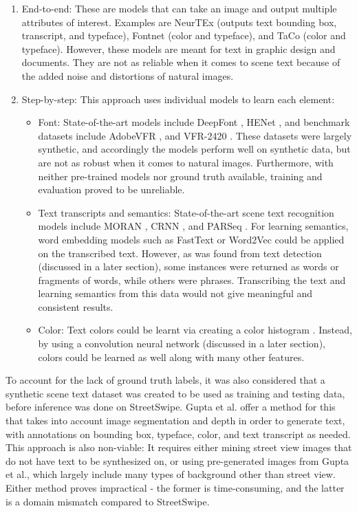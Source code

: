 \begin{enumerate}
    \item End-to-end: These are models that can take an image and output multiple attributes of interest. Examples are NeurTEx \cite{aggarwal_neurtex_2022} (outputs text bounding box, transcript, and typeface), Fontnet \cite{s_fontnet_2021} (color and typeface), and TaCo \cite{nie_taco_2022} (color and typeface). However, these models are meant for text in graphic design and documents. They are not as reliable when it comes to scene text because of the added noise and distortions of natural images.
    \item Step-by-step: This approach uses individual models to learn each element:
    \begin{itemize}
        \item Font: State-of-the-art models include DeepFont \cite{wang_deepfont_2015}, HENet \cite{chen_henet_2021}, and benchmark datasets include AdobeVFR \cite{wang_deepfont_2015}, and VFR-2420 \cite{chen_large-scale_2014}. These datasets were largely synthetic, and accordingly the models perform well on synthetic data, but are not as robust when it comes to natural images. Furthermore, with neither pre-trained models nor ground truth available, training and evaluation proved to be unreliable.
        \item Text transcripts and semantics: State-of-the-art scene text recognition models include MORAN \cite{luo_multi-object_2019}, CRNN \cite{shi_end2end_2015}, and PARSeq \cite{bautista_scene_2022}. For learning semantics, word embedding models such as FastText \cite{bojanowski_enriching_2017} or Word2Vec \cite{mikolov_efficient_2013} could be applied on the transcribed text. However, as was found from text detection (discussed in a later section), some instances were returned as words or fragments of words, while others were phrases. Transcribing the text and learning semantics from this data would not give meaningful and consistent results.
        \item Color: Text colors could be learnt via creating a color histogram \cite{srivastava_review_2015}. Instead, by using a convolution neural network (discussed in a later section), colors could be learned as well along with many other features.
    \end{itemize}
\end{enumerate}

To account for the lack of ground truth labels, it was also considered that a synthetic scene text dataset was created to be used as training and testing data, before inference was done on StreetSwipe. Gupta et al. \cite{gupta_synt_2016} offer a method for this that takes into account image segmentation and depth in order to generate text, with annotations on bounding box, typeface, color, and text transcript as needed. This approach is also non-viable: It requires either mining street view images that do not have text to be synthesized on, or using pre-generated images from Gupta et al., which largely include many types of background other than street view. Either method proves impractical - the former is time-consuming, and the latter is a domain mismatch compared to StreetSwipe.

